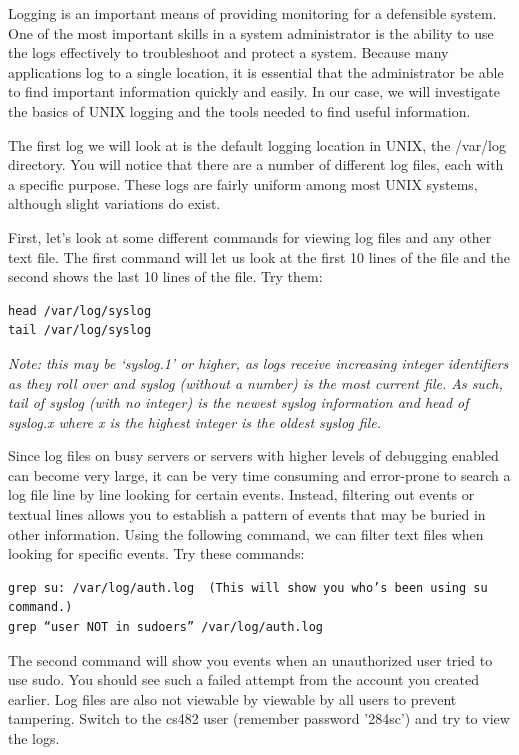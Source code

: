 \documentclass{article}
\begin{document}
Logging is an important means of providing monitoring for a defensible system. One of the most important skills in a system administrator is the ability to use the logs effectively to troubleshoot and protect a system. Because many applications log to a single location, it is essential that the administrator be able to find important information quickly and easily. In our case, we will investigate the basics of UNIX logging and the tools needed to find useful information.

The first log we will look at is the default logging location in UNIX, the /var/log directory. You will notice that there are a number of different log files, each with a specific purpose.  These logs are fairly uniform among most UNIX systems, although slight variations do exist.

First, let's look at some different commands for viewing log files and any other text file. The first command will let us look at the first 10 lines of the file and the second shows the last 10 lines of the file. Try them:
\begin{verbatim}
head /var/log/syslog
tail /var/log/syslog
\end{verbatim}

\medskip

\textit{Note: this may be ‘syslog.1’ or higher, as logs receive increasing integer identifiers as they roll over and syslog (without a number) is the most current file. As such, tail of syslog (with no integer) is the newest syslog information and head of syslog.x where x is the highest integer is the oldest syslog file.}

Since log files on busy servers or servers with higher levels of debugging enabled can become very large, it can be very time consuming and error-prone to search a log file line by line looking for certain events. Instead, filtering out events or textual lines allows you to establish a pattern of events that may be buried in other information. Using the following command, we can filter text files when looking for specific events. Try these commands:
\begin{verbatim}
grep su: /var/log/auth.log	(This will show you who’s been using su command.)
grep “user NOT in sudoers” /var/log/auth.log
\end{verbatim}

The second command will show you events when an unauthorized user tried to use sudo. You should see such a failed attempt from the account you created earlier. Log files are also not viewable by viewable by all users to prevent tampering. Switch to the cs482 user (remember password '284sc') and try to view the logs. \\ \medskip
\end{document}
